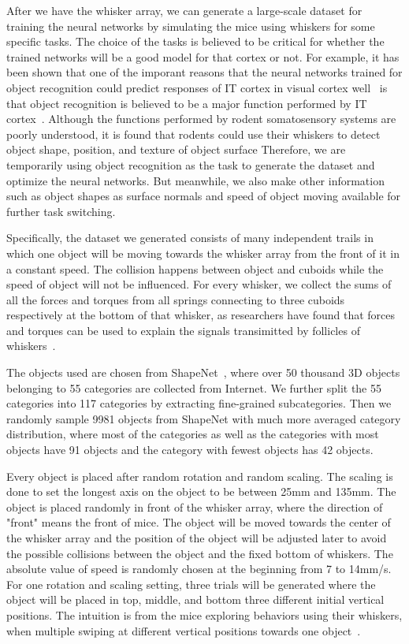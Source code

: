 After we have the whisker array, we can generate a large-scale dataset for training the neural networks by simulating the mice using whiskers for some specific tasks.
The choice of the tasks is believed to be critical for whether the trained networks will be a good model for that cortex or not.
For example, it has been shown that one of the imporant reasons that the neural networks trained for object recognition could predict responses of IT cortex in visual cortex well~\cite{cadieu2014deep, Yamins2014} is that object recognition is believed to be a major function performed by IT cortex~\cite{hung2005fast, yamins2016using}.
Although the functions performed by rodent somatosensory systems are poorly understood, it is found that rodents could use their whiskers to detect object shape, position, and texture of object surface\cite{Boubenec2012,Diamond2008,Arabzadeh2005,OConnor2010}
Therefore, we are temporarily using object recognition as the task to generate the dataset and optimize the neural networks.
But meanwhile, we also make other information such as object shapes as surface normals and speed of object moving available for further task switching.

Specifically, the dataset we generated consists of many independent trails in which one object will be moving towards the whisker array from the front of it in a constant speed.
The collision happens between object and cuboids while the speed of object will not be influenced.
For every whisker, we collect the sums of all the forces and torques from all springs connecting to three cuboids respectively at the bottom of that whisker, as researchers have found that forces and torques can be used to explain the signals transimitted by follicles of whiskers~\cite{Quist2014, Huet2016}.

The objects used are chosen from ShapeNet~\cite{Chang2015}, where over 50 thousand 3D objects belonging to 55 categories are collected from Internet.
We further split the 55 categories into 117 categories by extracting fine-grained subcategories.
Then we randomly sample 9981 objects from ShapeNet with much more averaged category distribution, where most of the categories as well as the categories with most objects have 91 objects and the category with fewest objects has 42 objects.

Every object is placed after random rotation and random scaling. The scaling is done to set the longest axis on the object to be between 25mm and 135mm. The object is placed randomly in front of the whisker array, where the direction of "front" means the front of mice.
The object will be moved towards the center of the whisker array and the position of the object will be adjusted later to avoid the possible collisions between the object and the fixed bottom of whiskers.
The absolute value of speed is randomly chosen at the beginning from 7 to 14mm/s.
For one rotation and scaling setting, three trials will be generated where the object will be placed in top, middle, and bottom three different initial vertical positions. The intuition is from the mice exploring behaviors using their whiskers, when multiple swiping at different vertical positions towards one object~\cite{hobbs2015spatiotemporal}.

